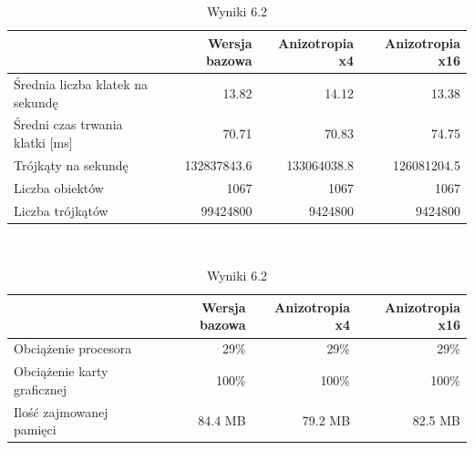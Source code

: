 \documentclass[a4paper,twoside,12pt]{book}
\begin{document}
\begin{table}[H]
    \centering
    \caption{Wyniki 6.2}
    \label{tab:ni_test2}
    \begin{tabular}{|l||r|r|r|}
        \hline
        & Wersja bazowa & Anizotropia x4 & Anizotropia x16 \\
        \hline
        Średnia liczba klatek na sekundę & 13.82 & 14.12 & 13.38 \\
        \hline
        Średni czas trwania klatki [ms] & 70.71 & 70.83 & 74.75 \\
        \hline
        Trójkąty na sekundę & 132837843.6 & 133064038.8 & 126081204.5 \\
        \hline
        Liczba obiektów & 1067 & 1067 & 1067 \\
        \hline
        Liczba trójkątów & 99424800 & 9424800 & 9424800 \\
        \hline
    \end{tabular} \\
    
    \vspace*{0.5 cm}
    
    \begin{tabular}{|l||r|r|r|}
         \hline
        & Wersja bazowa & Anizotropia x4 & Anizotropia x16 \\
        \hline
        Obciążenie procesora & 29\% & 29\% & 29\% \\
        \hline
        Obciążenie karty graficznej & 100\% & 100\% & 100\% \\
        \hline
        Ilość zajmowanej pamięci & 84.4 MB & 79.2 MB & 82.5 MB \\
        \hline
    \end{tabular}
\end{table}

\vbox{}
\end{document}
